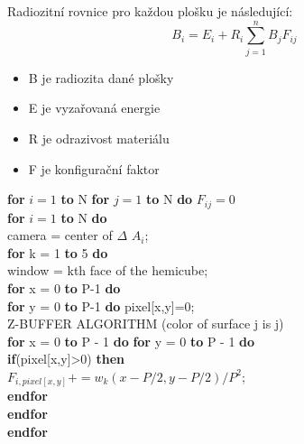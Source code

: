 \documentclass[12pt,a4paper,titlepage,final]{report}
\newcommand\tab[1][1cm]{\hspace*{#1}}
\begin{document}
Radiozitní rovnice pro každou plošku je následující: 
\begin{equation}
B_{i} = E_{i} + R_{i} \sum_{j=1}^n B_{j}F_{ij}
\end{equation}
\begin{itemize}
\item B je radiozita dané plošky
\item E je vyzařovaná energie 
\item R je odrazivost materiálu
\item F je konfigurační faktor
\end{itemize}

\begin{algorithm}
  \SetAlgoNoLine
  \SetNlSkip{0em}

\Indp
  
  \textbf{for} $i = 1 $ \textbf{to} N \textbf{for} $j = 1$ \textbf{to} N \textbf{do} $F_{ij}=0$ \\
  \textbf{for} $i = 1$ \textbf{to} N \textbf{do}\\
  \tab camera = center of $\Delta$ $A_{i}$;\\
  \tab \textbf{for} k = 1 \textbf{to} 5 \textbf{ do}\\
  \tab \tab window = kth face of the hemicube;\\
  \tab \tab \textbf{for} x = 0 \textbf{to} P-1 \textbf{do}\\
  \tab \tab \tab \textbf{for} y = 0 \textbf{to} P-1 \textbf{do} pixel[x,y]=0;\\
  \tab \tab Z-BUFFER ALGORITHM (color of surface j is j)\\
  \tab \tab \textbf{for} x = 0 \textbf{to} P - 1 \textbf{do} \textbf{for} y = 0 \textbf{to} P - 1 \textbf{do} \\
  \tab \tab \tab \textbf{if}(pixel[x,y]>0) \textbf{then}\\
  \tab \tab \tab \tab $F_{i,pixel[x,y]}+=w_{k}(x-P/2,y-P/2)/P^{2};$\\
  \tab \tab \tab \textbf{endfor}\\
  \tab \tab \textbf{endfor}\\
  \tab \textbf{endfor}
        
\caption{\textsc Algoritmus počítající konfigurační faktory s využitím Z-bufferu\label{algoritmus}}
\end{algorithm}



\end{document}
